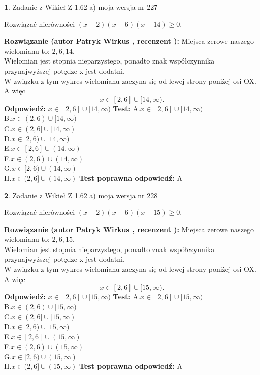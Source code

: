 \documentclass[12pt, a4paper]{article}
\theoremstyle{definition} %
\newtheorem{zad}{}
\newcommand{\zadStart}[1]{\begin{zad}#1\newline}
\newcommand{\zadStop}{\end{zad}}
\newcommand{\rozwStart}[2]{\noindent \textbf{Rozwiązanie (autor #1 , recenzent #2): }\newline}
\newcommand{\rozwStop}{\newline}
\newcommand{\odpStart}{\noindent \textbf{Odpowiedź:}\newline}
\newcommand{\odpStop}{\newline}
\newcommand{\testStart}{\noindent \textbf{Test:}\newline}
\newcommand{\testStop}{\newline}
\newcommand{\kluczStart}{\noindent \textbf{Test poprawna odpowiedź:}\newline}
\newcommand{\kluczStop}{\newline}
\begin{document}
\zadStart{Zadanie z Wikieł Z 1.62 a) moja wersja nr 227}

Rozwiązać nierówności $(x-2)(x-6)(x-14)\ge0$.
\zadStop
\rozwStart{Patryk Wirkus}{}
Miejsca zerowe naszego wielomianu to: $2, 6, 14$.\\
Wielomian jest stopnia nieparzystego, ponadto znak współczynnika przy\linebreak najwyższej potędze x jest dodatni.\\ W związku z tym wykres wielomianu zaczyna się od lewej strony poniżej osi OX. A więc $$x \in [2,6] \cup [14,\infty).$$
\rozwStop
\odpStart
$x \in [2,6] \cup [14,\infty)$
\odpStop
\testStart
A.$x \in [2,6] \cup [14,\infty)$\\
B.$x \in (2,6) \cup [14,\infty)$\\
C.$x \in (2,6] \cup [14,\infty)$\\
D.$x \in [2,6) \cup [14,\infty)$\\
E.$x \in [2,6] \cup (14,\infty)$\\
F.$x \in (2,6) \cup (14,\infty)$\\
G.$x \in [2,6) \cup (14,\infty)$\\
H.$x \in (2,6] \cup (14,\infty)$
\testStop
\kluczStart
A
\kluczStop



\zadStart{Zadanie z Wikieł Z 1.62 a) moja wersja nr 228}

Rozwiązać nierówności $(x-2)(x-6)(x-15)\ge0$.
\zadStop
\rozwStart{Patryk Wirkus}{}
Miejsca zerowe naszego wielomianu to: $2, 6, 15$.\\
Wielomian jest stopnia nieparzystego, ponadto znak współczynnika przy\linebreak najwyższej potędze x jest dodatni.\\ W związku z tym wykres wielomianu zaczyna się od lewej strony poniżej osi OX. A więc $$x \in [2,6] \cup [15,\infty).$$
\rozwStop
\odpStart
$x \in [2,6] \cup [15,\infty)$
\odpStop
\testStart
A.$x \in [2,6] \cup [15,\infty)$\\
B.$x \in (2,6) \cup [15,\infty)$\\
C.$x \in (2,6] \cup [15,\infty)$\\
D.$x \in [2,6) \cup [15,\infty)$\\
E.$x \in [2,6] \cup (15,\infty)$\\
F.$x \in (2,6) \cup (15,\infty)$\\
G.$x \in [2,6) \cup (15,\infty)$\\
H.$x \in (2,6] \cup (15,\infty)$
\testStop
\kluczStart
A
\kluczStop
\end{document}
